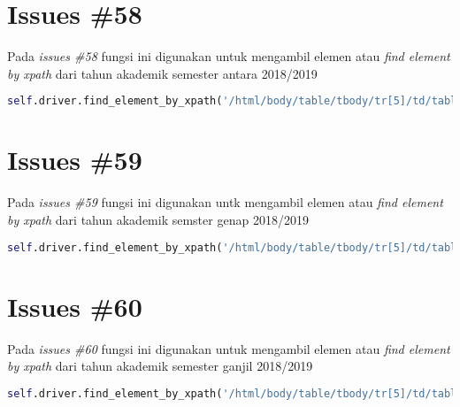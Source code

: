 \section{Issues \#58}
Pada \textit{issues \#58} fungsi ini digunakan untuk mengambil elemen atau \textit{find element by xpath} dari tahun akademik semester antara 2018/2019
\begin{lstlisting}[language=Python]
self.driver.find_element_by_xpath('/html/body/table/tbody/tr[5]/td/table[3]/tbody/tr[1]/td[2]/p/table/tbody/tr[2]/td[2]/select/option[3]').click()
\end{lstlisting}

\section{Issues \#59}
Pada \textit{issues \#59}  fungsi ini digunakan untk mengambil elemen atau \textit{find element by xpath} dari tahun akademik semster genap 2018/2019
\begin{lstlisting}[language=Python]
self.driver.find_element_by_xpath('/html/body/table/tbody/tr[5]/td/table[3]/tbody/tr[1]/td[2]/p/table/tbody/tr[2]/td[2]/select/option[4]').click()
\end{lstlisting}

\section{Issues \#60}
Pada \textit{issues \#60}  fungsi ini digunakan untuk mengambil elemen atau \textit{find element by xpath} dari tahun akademik semester ganjil 2018/2019
\begin{lstlisting}[language=Python]
self.driver.find_element_by_xpath('/html/body/table/tbody/tr[5]/td/table[3]/tbody/tr[1]/td[2]/p/table/tbody/tr[2]/td[2]/select/option[5]').click()
\end{lstlisting}




